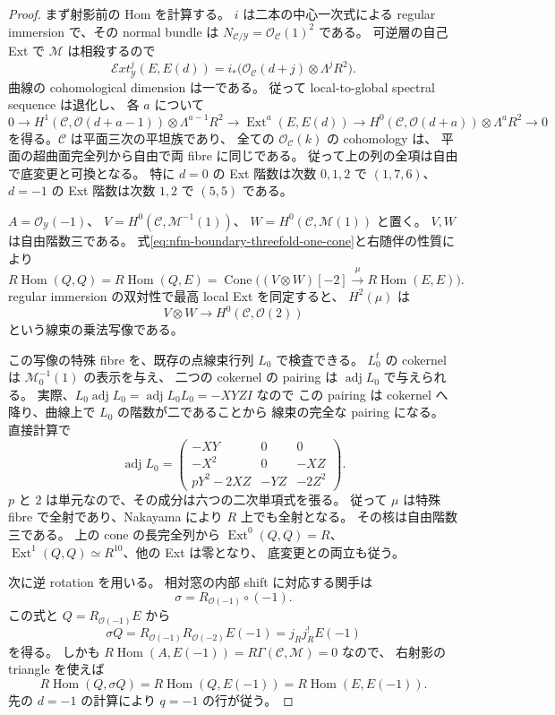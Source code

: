 \begin{proof}
まず射影前の Hom を計算する。
$i$ は二本の中心一次式による regular immersion で、その normal bundle は
$N_{\mathcal C/\mathcal Y}=\mathcal O_{\mathcal C}(1)^2$ である。
可逆層の自己 Ext で $\mathcal M$ は相殺するので
\[
 \mathcal Ext^j_{\mathcal Y}(E,E(d))
   =i_*\bigl(\mathcal O_{\mathcal C}(d+j)\otimes\Lambda^jR^2\bigr).
\]
曲線の cohomological dimension は一である。
従って local-to-global spectral sequence は退化し、
各 $a$ について
\[
 0\to H^1(\mathcal C,\mathcal O(d+a-1))\otimes\Lambda^{a-1}R^2
 \to\operatorname{Ext}^a(E,E(d))
 \to H^0(\mathcal C,\mathcal O(d+a))\otimes\Lambda^aR^2\to0
\]
を得る。$\mathcal C$ は平面三次の平坦族であり、
全ての $\mathcal O_{\mathcal C}(k)$ の cohomology は、
平面の超曲面完全列から自由で両 fibre に同じである。
従って上の列の全項は自由で底変更と可換となる。
特に $d=0$ の Ext 階数は次数 $0,1,2$ で $(1,7,6)$、
$d=-1$ の Ext 階数は次数 $1,2$ で $(5,5)$ である。

$A=\mathcal O_{\mathcal Y}(-1)$、
$V=H^0(\mathcal C,\mathcal M^{-1}(1))$、
$W=H^0(\mathcal C,\mathcal M(1))$ と置く。
$V,W$ は自由階数三である。
式\eqref{eq:nfm-boundary-threefold-one-cone}と右随伴の性質により
\[
 R\operatorname{Hom}(Q,Q)
 =R\operatorname{Hom}(Q,E)
 =\operatorname{Cone}\bigl(
     (V\otimes W)[-2]\xrightarrow{\mu}R\operatorname{Hom}(E,E)\bigr).
\]
regular immersion の双対性で最高 local Ext を同定すると、
$H^2(\mu)$ は
\[
 V\otimes W\longrightarrow H^0(\mathcal C,\mathcal O(2))
\]
という線束の乗法写像である。

この写像の特殊 fibre を、既存の点線束行列 $L_0$ で検査できる。
$L_0^t$ の cokernel は $\mathcal M_0^{-1}(1)$ の表示を与え、
二つの cokernel の pairing は $\operatorname{adj}L_0$ で与えられる。
実際、$L_0\operatorname{adj}L_0=\operatorname{adj}L_0L_0=-XYZ I$ なので
この pairing は cokernel へ降り、曲線上で $L_0$ の階数が二であることから
線束の完全な pairing になる。
直接計算で
\[
 \operatorname{adj}L_0=
 \begin{pmatrix}
 -XY&0&0\\-X^2&0&-XZ\\pY^2-2XZ&-YZ&-2Z^2
 \end{pmatrix}.
\]
$p$ と $2$ は単元なので、その成分は六つの二次単項式を張る。
従って $\mu$ は特殊 fibre で全射であり、Nakayama により $R$ 上でも全射となる。
その核は自由階数三である。
上の cone の長完全列から $\operatorname{Ext}^0(Q,Q)=R$、
$\operatorname{Ext}^1(Q,Q)\simeq R^{10}$、他の Ext は零となり、
底変更との両立も従う。

次に逆 rotation を用いる。
相対窓の内部 shift に対応する関手は
\[
 \sigma=R_{\mathcal O(-1)}\circ(-1).
\]
この式と $Q=R_{\mathcal O(-1)}E$ から
\[
 \sigma Q=R_{\mathcal O(-1)}R_{\mathcal O(-2)}E(-1)=j_Rj_R^!E(-1)
\]
を得る。
しかも $R\operatorname{Hom}(A,E(-1))=R\Gamma(\mathcal C,\mathcal M)=0$ なので、
右射影の triangle を使えば
\[
 R\operatorname{Hom}(Q,\sigma Q)
 =R\operatorname{Hom}(Q,E(-1))
 =R\operatorname{Hom}(E,E(-1)).
\]
先の $d=-1$ の計算により $q=-1$ の行が従う。


\end{proof}
